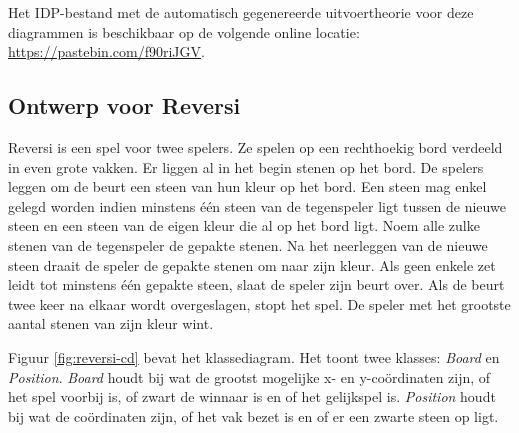 Het IDP-bestand met de automatisch gegenereerde uitvoertheorie voor deze diagrammen is beschikbaar op de volgende online locatie: \url{https://pastebin.com/f90riJGV}.


\subsection{Ontwerp voor Reversi}\label{sec:reversi-design}

Reversi is een spel voor twee spelers. Ze spelen op een rechthoekig bord verdeeld in even grote vakken. Er liggen al in het begin stenen op het bord. De spelers leggen om de beurt een steen van hun kleur op het bord. Een steen mag enkel gelegd worden indien minstens \'e\'en steen van de tegenspeler ligt tussen de nieuwe steen en een steen van de eigen kleur die al op het bord ligt. Noem alle zulke stenen van de tegenspeler de gepakte stenen. Na het neerleggen van de nieuwe steen draait de speler de gepakte stenen om naar zijn kleur. Als geen enkele zet leidt tot minstens \'e\'en gepakte steen, slaat de speler zijn beurt over. Als de beurt twee keer na elkaar wordt overgeslagen, stopt het spel. De speler met het grootste aantal stenen van zijn kleur wint.

Figuur \ref{fig:reversi-cd} bevat het klassediagram. Het toont twee klasses: \textit{Board} en \textit{Position}. \textit{Board} houdt bij wat de grootst mogelijke x- en y-co\"ordinaten zijn, of het spel voorbij is, of zwart de winnaar is en of het gelijkspel is. \textit{Position} houdt bij wat de co\"ordinaten zijn, of het vak bezet is en of er een zwarte steen op ligt.

